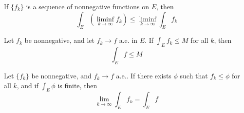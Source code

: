 \documentclass[openany]{book}
\begin{document}
\begin{thm}
    If $\{f_k\}$ is a sequence of nonnegative functions on $E$, then 
    \begin{equation*}
        \int_E(\liminf_{k\to\infty}f_k)\leq\liminf_{k\to\infty}\int_Ef_k
    \end{equation*}
\end{thm}
\begin{prop}
    Let $f_k$ be nonnegative, and let $f_k\to f$ a.e. in $E$. If $\int_Ef_k\leq M$ for all $k$, then 
    \begin{equation*}
        \int_E f\leq M
    \end{equation*}
\end{prop}
\begin{thm}
    Let $\{f_k\}$ be nonnegative, and $f_k\to f$ a.e.. If there exists $\phi$ such that $f_k\leq\phi$ for all $k$, and if $\int_E\phi$ is finite, then 
    \begin{equation*}
        \lim_{k\to\infty}\int_Ef_k=\int_Ef
    \end{equation*}
\end{thm}
\end{document}
